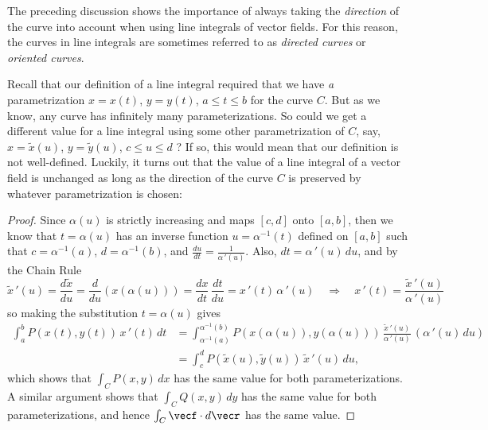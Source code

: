 The preceding discussion shows the importance of always taking the \emph{direction} of the curve into account when using line integrals of vector fields. For this reason, the curves in line integrals are sometimes referred to as \emph{directed curves} or \emph{oriented curves}.

Recall that our definition of a line integral required that we have \emph{a} parametrization $x=x(t)$, $y=y(t)$, $a \le t \le b$ for the curve $C$. But as we know, any curve has infinitely many parameterizations. So could we get a different value for a line integral using some other parametrization of $C$, say, $x=\tilde{x}(u)$, $y=\tilde{y}(u)$, $c \le u \le d$ ? If so, this would mean that our definition is not well-defined. Luckily, it turns out that the value of a line integral of a vector field is unchanged as long as the direction of the curve $C$ is preserved by whatever parametrization is chosen:


\begin{proof}
 Since $\alpha(u)$ is strictly increasing and maps $[c,d]$ onto $[a,b]$, then we know that $t=\alpha(u)$ has an inverse function $u=\alpha^{-1}(t)$ defined on $[a,b]$ such that $c=\alpha^{-1}(a)$, $d=\alpha^{-1}(b)$, and $\frac{du}{dt} = \frac{1}{\alpha\,'(u)}$. Also, $dt = \alpha\,'(u)\,du$, and by the Chain Rule
 \[
  \tilde{x}\,'(u) = \frac{d\tilde{x}}{du} = \frac{d}{du}(x(\alpha(u))) = \frac{dx}{dt}\,\frac{dt}{du} =
  x\,'(t)\,\alpha\,'(u) \quad\Rightarrow\quad x\,'(t) = \frac{\tilde{x}\,'(u)}{\alpha\,'(u)}
 \]
 so making the substitution $t=\alpha(u)$ gives
 \begin{align*}
  \int_a^b P(x(t),y(t))\,x\,'(t)\,dt &=
   \int_{\alpha^{-1}(a)}^{\alpha^{-1}(b)} P(x(\alpha(u)),y(\alpha(u)))\,\frac{\tilde{x}\,'(u)}{\alpha\,'(u)}
   \,(\alpha\,'(u)\,du)\\
   &= \int_c^d P(\tilde{x}(u),\tilde{y}(u))\,\tilde{x}\,'(u)\,du ,
 \end{align*}
 which shows that $\int_C P(x,y)\,dx$ has the same value for both parameterizations. A similar argument shows that $\int_C Q(x,y)\,dy$ has the same value for both parameterizations, and hence $\int_C \vecf\cdot d\vecr$
 has the same value.
\end{proof}

